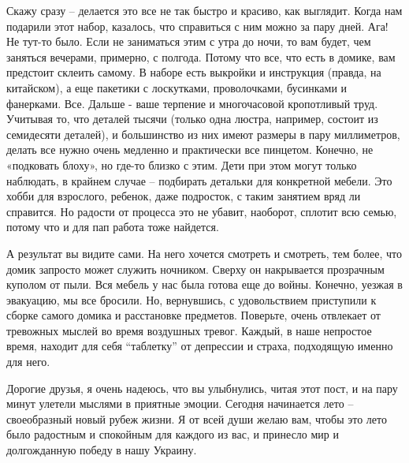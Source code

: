 Скажу сразу – делается это все не так быстро и красиво, как выглядит.
Когда нам подарили этот набор, казалось, что справиться с ним можно за
пару дней. Ага! Не тут-то было. Если не заниматься этим с утра до ночи, то
вам будет, чем заняться вечерами, примерно, с полгода. Потому что все, что
есть в домике, вам предстоит склеить самому. В наборе есть выкройки и
инструкция (правда, на китайском), а еще пакетики с лоскутками,
проволочками, бусинками и фанерками. Все. Дальше - ваше терпение и
многочасовой кропотливый труд.  Учитывая то, что деталей тысячи (только
одна люстра, например, состоит из семидесяти деталей), и большинство из
них имеют размеры в пару миллиметров, делать все нужно очень медленно и
практически все пинцетом. Конечно, не «подковать блоху», но где-то близко
с этим. Дети при этом могут только наблюдать, в крайнем случае – подбирать
детальки для конкретной мебели. Это хобби для взрослого, ребенок, даже
подросток, с таким занятием вряд ли справится. Но радости от процесса это
не убавит, наоборот, сплотит всю семью, потому что и для пап работа тоже
найдется.

А результат вы видите сами. На него хочется смотреть и смотреть, тем
более, что домик запросто может служить ночником. Сверху он накрывается
прозрачным куполом от пыли. Вся мебель у нас была готова еще до войны.
Конечно, уезжая в эвакуацию, мы все бросили. Но, вернувшись, с
удовольствием приступили к сборке самого домика и расстановке предметов.
Поверьте, очень отвлекает от тревожных мыслей во время воздушных тревог.
Каждый, в наше непростое время, находит для себя \enquote{таблетку} от депрессии и
страха, подходящую именно для него.

Дорогие друзья, я очень надеюсь, что вы улыбнулись, читая этот пост, и на
пару минут улетели мыслями в приятные эмоции. Сегодня начинается лето –
своеобразный новый рубеж жизни. Я от всей души желаю вам, чтобы это лето
было радостным и спокойным для каждого из вас, и принесло мир и
долгожданную победу в нашу Украину.

